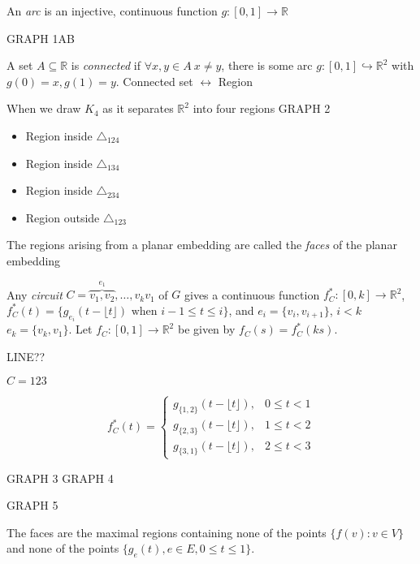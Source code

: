 \documentclass{article}
\begin{document}
An \emph{arc} is an injective, continuous function $g:[0,1] \rightarrow \mathbb{R}$

GRAPH 1AB

A set $A \subseteq \mathbb{R}$ is \emph{connected} if $\forall x,y \in A~ x \neq y$, there is some arc $g:[0,1] \hookrightarrow \mathbb{R}^2$ with $g(0) = x, g(1)=y$.   Connected set $\longleftrightarrow$ Region

\begin{examp}
When we draw $K_4$ as it separates $\mathbb{R}^2$ into four regions GRAPH 2
\begin{itemize}
 \item Region inside $\triangle_{124}$
\item Region inside $\triangle_{134}$
\item Region inside $\triangle_{234}$
\item Region outside $\triangle_{123}$
\end{itemize}
\end{examp}

The regions arising from a planar embedding are called the \emph{faces} of the planar embedding

Any \emph{circuit} $C=\overbrace{v_1,v_2}^{e_1}, \ldots, v_k v_1$ of $G$ gives a continuous function $f_C^*:[0,k] \rightarrow \mathbb{R}^2$, $f_C^*(t) = \{g_{e_i}(t-\lfloor t \rfloor) \text{ when } i-1 \leq t \leq i \}$, and $e_i=\{v_i, v_{i+1}\}$, $i<k$ $e_k=\{v_k, v_1\}$.  Let $f_C:[0,1] \rightarrow \mathbb{R}^2$ be given by $f_C(s)=f_C^*(k s)$.

LINE??

$C=123$

\[f_C^*(t)=\left\{
\begin{array}{ll}
g_{\{1,2\}}(t- \lfloor t \rfloor ) ,& 0 \leq t <1 \\
g_{\{2,3\}}(t- \lfloor t \rfloor ) ,& 1 \leq t <2 \\
g_{\{3,1\}}(t- \lfloor t \rfloor ) ,& 2 \leq t <3 
\end{array} \right.\]

\begin{examp}
GRAPH 3 GRAPH 4
\end{examp}

GRAPH 5

\begin{rem}
The faces are the maximal regions containing none of the points $\{f(v): v \in V\}$ and none of the points $\{g_e(t), e\in E, 0 \leq t \leq 1 \}$.
\end{rem}
\end{document}
